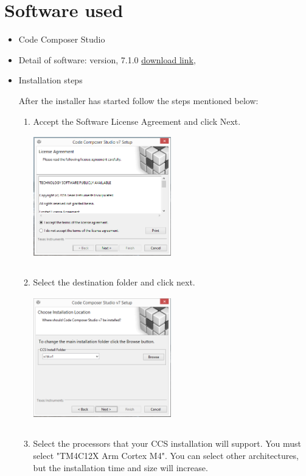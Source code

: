 \documentclass[a4paper,12pt,oneside]{book}
\begin{document}
\section{Software used}
\begin{itemize}
  \item Code Composer Studio
  \item Detail of software: version, 7.1.0  \href{http://processors.wiki.ti.com/index.php/Download_CCS}{download link}, 
  \item Installation steps
  	{After the installer has started follow the steps mentioned below:\\
  	\begin{enumerate}
  		\item Accept the Software License Agreement and click Next.\\
  		{\centering
  			\includegraphics[width=6cm, height=6cm]{CCSInstall1}}
  		\item Select the destination folder and click next.\\
  		{\centering
  			\includegraphics[width=6cm, height=6cm]{CCSInstall2}}
  		\item Select the processors that your CCS installation will support. You
  		must select "TM4C12X Arm Cortex M4". You can select other architectures, but the installation time and size will increase.\\{\centering
}
\end{enumerate}}
\end{itemize}
\end{document}
